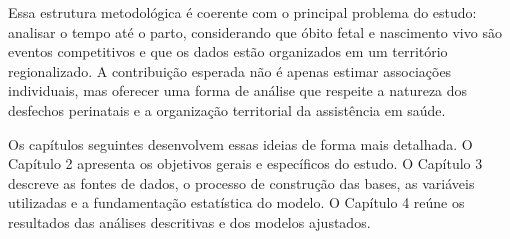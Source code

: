 Essa estrutura metodológica é coerente com o principal problema do estudo: analisar 
o tempo até o parto, considerando que óbito fetal e nascimento vivo são eventos 
competitivos e que os dados estão organizados em um território regionalizado. A 
contribuição esperada não é apenas estimar associações individuais, mas oferecer uma 
forma de análise que respeite a natureza dos desfechos perinatais e a organização 
territorial da assistência em saúde. 

Os capítulos seguintes desenvolvem essas ideias de forma mais detalhada. O Capítulo 2 
apresenta os objetivos gerais e específicos do estudo. O Capítulo 3 descreve as 
fontes de dados, o processo de construção das bases, as variáveis utilizadas e a 
fundamentação estatística do modelo. O Capítulo 4 reúne os resultados das análises 
descritivas e dos modelos ajustados.
